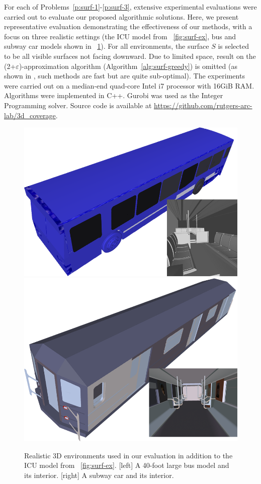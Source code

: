 For each of Problems~\ref{p:surf-1}-\ref{p:surf-3}, extensive experimental evaluations were carried out to evaluate our proposed algorithmic solutions. Here, we present representative evaluation demonstrating the effectiveness of our methods, with a focus on three realistic settings (the ICU model from ~\ref{fig:surf-ex}, bus and subway car models shown in ~\ref{fig:surf-bus-subway}). %
For all environments, the surface $S$ is selected to be all visible surfaces not facing downward.
Due to limited space, result on the (2+$\varepsilon$)-approximation algorithm (Algorithm~\ref{alg:surf-greedy}) is omitted (as shown in \cite{fengyu2020optimally}, such methods are fast but are quite sub-optimal). The experiments were carried out on a median-end quad-core Intel i7 processor with 16GiB RAM. 
Algorithms were implemented in C++. Gurobi \cite{optimization2019gurobi} was used as the Integer Programming solver. 
Source code is available at 
{\small \url{https://github.com/rutgers-arc-lab/3d_coverage}}.

\begin{figure}[!ht]
    \centering
    \includegraphics[width = .4\columnwidth]{chapters/surf/fig/bus.png}\hspace{3mm}
    \includegraphics[width = .4\columnwidth]{chapters/surf/fig/subway.png}
    \caption[Real 3D environments used in our evaluation in addition to the ICU model]
    {Realistic 3D environments used in our evaluation in addition to the ICU model from ~\ref{fig:surf-ex}. [left] A 40-foot large bus model and its interior. [right] A subway car and its interior.}
    \label{fig:surf-bus-subway}
\end{figure}

